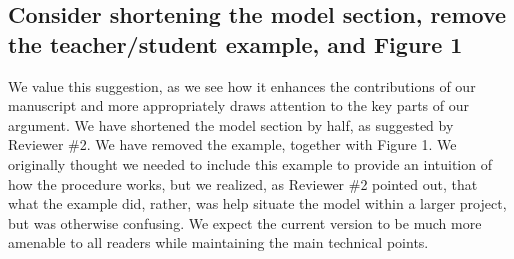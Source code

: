 \documentclass[article,letterpaper,times,12pt,listings-bw,microtype]{article}
\begin{document}
\subsection{Consider shortening the model section, remove the teacher/student example, and Figure 1}
We value this suggestion, as we see how it enhances the contributions of our manuscript and more appropriately draws attention to the key parts of our argument. We have shortened the model section by half, as suggested by Reviewer \#2. We have removed the example, together with Figure 1. We originally thought we needed to include this example to provide an intuition of how the procedure works, but we realized, as Reviewer \#2 pointed out, that what the example did, rather, was help situate the model within a larger project, but was otherwise confusing. We expect the current version to be much more amenable to all readers while maintaining the main technical points. 



\end{document}
